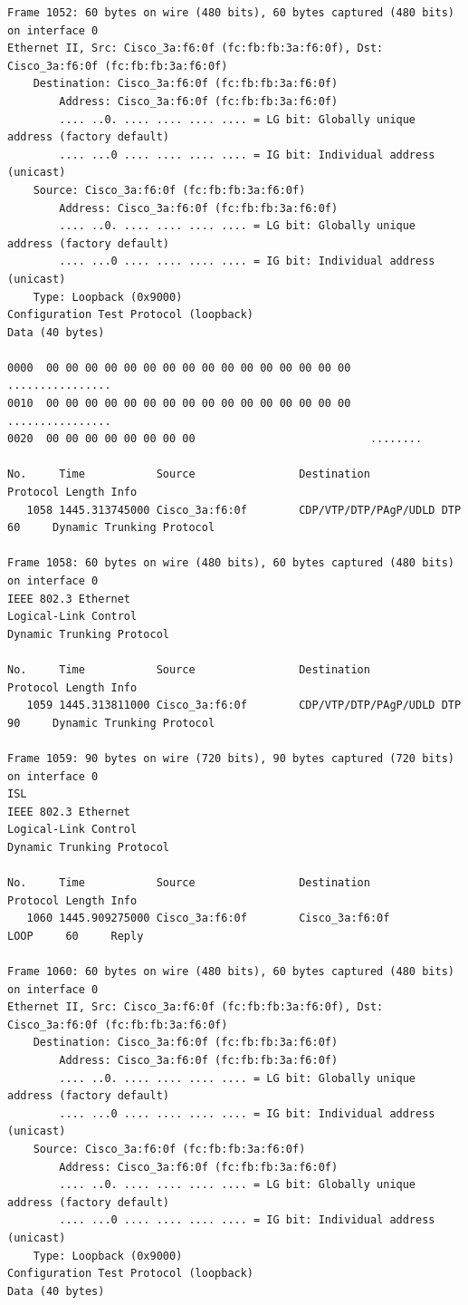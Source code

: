 \documentclass[a4paper,11pt]{article}
\begin{document}
\begin{lstlisting}
Frame 1052: 60 bytes on wire (480 bits), 60 bytes captured (480 bits) on interface 0
Ethernet II, Src: Cisco_3a:f6:0f (fc:fb:fb:3a:f6:0f), Dst: Cisco_3a:f6:0f (fc:fb:fb:3a:f6:0f)
    Destination: Cisco_3a:f6:0f (fc:fb:fb:3a:f6:0f)
        Address: Cisco_3a:f6:0f (fc:fb:fb:3a:f6:0f)
        .... ..0. .... .... .... .... = LG bit: Globally unique address (factory default)
        .... ...0 .... .... .... .... = IG bit: Individual address (unicast)
    Source: Cisco_3a:f6:0f (fc:fb:fb:3a:f6:0f)
        Address: Cisco_3a:f6:0f (fc:fb:fb:3a:f6:0f)
        .... ..0. .... .... .... .... = LG bit: Globally unique address (factory default)
        .... ...0 .... .... .... .... = IG bit: Individual address (unicast)
    Type: Loopback (0x9000)
Configuration Test Protocol (loopback)
Data (40 bytes)

0000  00 00 00 00 00 00 00 00 00 00 00 00 00 00 00 00   ................
0010  00 00 00 00 00 00 00 00 00 00 00 00 00 00 00 00   ................
0020  00 00 00 00 00 00 00 00                           ........

No.     Time           Source                Destination           Protocol Length Info
   1058 1445.313745000 Cisco_3a:f6:0f        CDP/VTP/DTP/PAgP/UDLD DTP      60     Dynamic Trunking Protocol

Frame 1058: 60 bytes on wire (480 bits), 60 bytes captured (480 bits) on interface 0
IEEE 802.3 Ethernet 
Logical-Link Control
Dynamic Trunking Protocol

No.     Time           Source                Destination           Protocol Length Info
   1059 1445.313811000 Cisco_3a:f6:0f        CDP/VTP/DTP/PAgP/UDLD DTP      90     Dynamic Trunking Protocol

Frame 1059: 90 bytes on wire (720 bits), 90 bytes captured (720 bits) on interface 0
ISL
IEEE 802.3 Ethernet 
Logical-Link Control
Dynamic Trunking Protocol

No.     Time           Source                Destination           Protocol Length Info
   1060 1445.909275000 Cisco_3a:f6:0f        Cisco_3a:f6:0f        LOOP     60     Reply

Frame 1060: 60 bytes on wire (480 bits), 60 bytes captured (480 bits) on interface 0
Ethernet II, Src: Cisco_3a:f6:0f (fc:fb:fb:3a:f6:0f), Dst: Cisco_3a:f6:0f (fc:fb:fb:3a:f6:0f)
    Destination: Cisco_3a:f6:0f (fc:fb:fb:3a:f6:0f)
        Address: Cisco_3a:f6:0f (fc:fb:fb:3a:f6:0f)
        .... ..0. .... .... .... .... = LG bit: Globally unique address (factory default)
        .... ...0 .... .... .... .... = IG bit: Individual address (unicast)
    Source: Cisco_3a:f6:0f (fc:fb:fb:3a:f6:0f)
        Address: Cisco_3a:f6:0f (fc:fb:fb:3a:f6:0f)
        .... ..0. .... .... .... .... = LG bit: Globally unique address (factory default)
        .... ...0 .... .... .... .... = IG bit: Individual address (unicast)
    Type: Loopback (0x9000)
Configuration Test Protocol (loopback)
Data (40 bytes)


\end{lstlisting}
\end{document}
